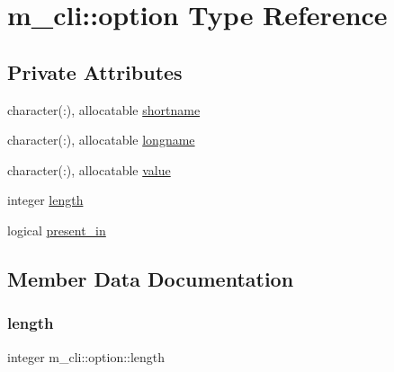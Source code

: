 \hypertarget{structm__cli_1_1option}{}\section{m\+\_\+cli\+:\+:option Type Reference}
\label{structm__cli_1_1option}
\subsection*{Private Attributes}
\begin{DoxyCompactItemize}
\item 
character(\+:), allocatable \mbox{\hyperlink{structm__cli_1_1option_aa692838478185b97d4cfd1466f50bbd2}{shortname}}
\item 
character(\+:), allocatable \mbox{\hyperlink{structm__cli_1_1option_a62395dcd3084458b35eb3d17d83629e3}{longname}}
\item 
character(\+:), allocatable \mbox{\hyperlink{structm__cli_1_1option_af205e1577880efcf61a60b96b27adfcb}{value}}
\item 
integer \mbox{\hyperlink{structm__cli_1_1option_a509fac088013b99dd798fdc65ff19bd2}{length}}
\item 
logical \mbox{\hyperlink{structm__cli_1_1option_a03434888018f675f2680f5defdc4b739}{present\+\_\+in}}
\end{DoxyCompactItemize}


\subsection{Member Data Documentation}
\mbox{\label{structm__cli_1_1option_a509fac088013b99dd798fdc65ff19bd2}} 
\subsubsection{\texorpdfstring{length}{length}}
{\footnotesize\ttfamily integer m\+\_\+cli\+::option\+::length\hspace{0.3cm}{\ttfamily [private]}}

\mbox{\label{structm__cli_1_1option_a62395dcd3084458b35eb3d17d83629e3}} 
